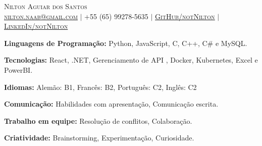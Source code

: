 \documentclass[9pt]{developercv}
\begin{document}

\newcommand{\yourName}{Nilton Aguiar dos Santos}
\newcommand{\yourEmail}{nilton.naab@gmail.com}
\newcommand{\yourPhone}{+55 (65) 99278-5635 }
\newcommand{\githubUserName}{notNilton}
\newcommand{\linkedinUserName}{notNilton}

\begin{center}
    \Huge 
    \scshape {\yourName} \\ 
    \vspace{10pt}
    \normalsize 
    \href{mailto:\yourEmail}{\underline{\yourEmail}}
    \enspace $|$ \enspace
    \yourPhone
    \enspace $|$ \enspace
    \href{https://github.com/\githubUserName}{\underline{GitHub/\githubUserName}}
    \enspace $|$ \enspace
    \href{https://www.linkedin.com/in/notnilton/}{\underline{LinkedIn/\linkedinUserName}}

\end{center}



\begin{minipage}[t]{0.55\textwidth}
	\vspace{-6pt}
 
        \textbf{Linguagens de Programação: }{Python, JavaScript, C, C++, C\# e MySQL.}
        
        \vspace{0.25pt}
        
        \textbf{Tecnologias: }{React, .NET, Gerenciamento de API                , Docker, Kubernetes, Excel e PowerBI.}
       
        \vspace{0.25pt}
        
        \textbf{Idiomas: }{{Alemão: }{B1}, {Francês: }{B2}, {Português: }{C2}, {Inglês: }{C2}}

\end{minipage}
\hfill %
\begin{minipage}[t]{0.40\textwidth}
	\vspace{-6pt}
 
        \textbf{Comunicação: }{Habilidades com apresentação, Comunicação escrita.}
        
        \vspace{0.25pt}
        
        \textbf{Trabalho em equipe: }{Resolução de conflitos, Colaboração.}

        \vspace{0.25pt}
        
        \textbf{Criatividade: }{Brainstorming, Experimentação, Curiosidade.}
\end{minipage}
\end{document}

